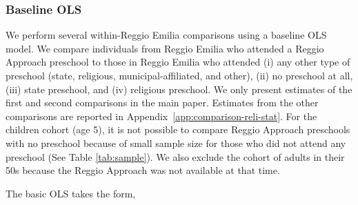 \subsubsection{Baseline OLS} \label{subsubsection:OLS}
We perform several within-Reggio Emilia comparisons using a baseline OLS model. We compare individuals from Reggio Emilia who attended a Reggio Approach preschool to those in Reggio Emilia who attended (i) any other type of preschool (state, religious, municipal-affiliated, and other), (ii) no preschool at all, (iii) state preschool, and (iv) religious preschool. We only present estimates of the first and second comparisons in the main paper. Estimates from the other comparisons are reported in Appendix~\ref{app:comparison-reli-stat}. %
For the children cohort (age 5), it is not possible to compare Reggio Approach preschools with no preschool because of small sample size for those who did not attend any preschool (See Table \ref{tab:sample}). We also exclude the cohort of adults in their 50s because the Reggio Approach was not available at that time.

The basic OLS takes the form,

